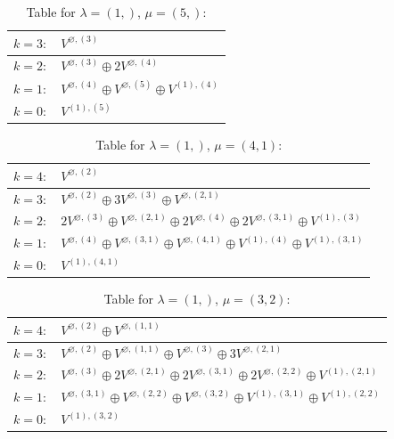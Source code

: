 \documentclass[a4paper,12pt]{article}
\begin{document}
\renewcommand{\arraystretch}{1.6} 
\begin{table}[H]
\centering
\caption{Table for $\lambda = (1,)$, $\mu = (5,)$:}
\begin{tabular}{|>{\centering\arraybackslash}p{15cm}|}
\hline
 $k = 3: \quad V^{\varnothing, (3)} $ \\ \hline
 $k = 2: \quad V^{\varnothing, (3)} \oplus 2 V^{\varnothing, (4)} $ \\ \hline
 $k = 1: \quad V^{\varnothing, (4)} \oplus V^{\varnothing, (5)} \oplus V^{(1), (4)} $ \\ \hline
 $k = 0: \quad V^{(1), (5)} $ \\ \hline
\end{tabular}
\end{table}

\renewcommand{\arraystretch}{1.6} 
\begin{table}[H]
\centering
\caption{Table for $\lambda = (1,)$, $\mu = (4, 1)$:}
\begin{tabular}{|>{\centering\arraybackslash}p{15cm}|}
\hline
 $k = 4: \quad V^{\varnothing, (2)} $ \\ \hline
 $k = 3: \quad V^{\varnothing, (2)} \oplus 3 V^{\varnothing, (3)} \oplus V^{\varnothing, (2, 1)} $ \\ \hline
 $k = 2: \quad 2 V^{\varnothing, (3)} \oplus V^{\varnothing, (2, 1)} \oplus 2 V^{\varnothing, (4)} \oplus 2 V^{\varnothing, (3, 1)} \oplus V^{(1), (3)} $ \\ \hline
 $k = 1: \quad V^{\varnothing, (4)} \oplus V^{\varnothing, (3, 1)} \oplus V^{\varnothing, (4, 1)} \oplus V^{(1), (4)} \oplus V^{(1), (3, 1)} $ \\ \hline
 $k = 0: \quad V^{(1), (4, 1)} $ \\ \hline
\end{tabular}
\end{table}

\renewcommand{\arraystretch}{1.6} 
\begin{table}[H]
\centering
\caption{Table for $\lambda = (1,)$, $\mu = (3, 2)$:}
\begin{tabular}{|>{\centering\arraybackslash}p{15cm}|}
\hline
 $k = 4: \quad V^{\varnothing, (2)} \oplus V^{\varnothing, (1, 1)} $ \\ \hline
 $k = 3: \quad V^{\varnothing, (2)} \oplus V^{\varnothing, (1, 1)} \oplus V^{\varnothing, (3)} \oplus 3 V^{\varnothing, (2, 1)} $ \\ \hline
 $k = 2: \quad V^{\varnothing, (3)} \oplus 2 V^{\varnothing, (2, 1)} \oplus 2 V^{\varnothing, (3, 1)} \oplus 2 V^{\varnothing, (2, 2)} \oplus V^{(1), (2, 1)} $ \\ \hline
 $k = 1: \quad V^{\varnothing, (3, 1)} \oplus V^{\varnothing, (2, 2)} \oplus V^{\varnothing, (3, 2)} \oplus V^{(1), (3, 1)} \oplus V^{(1), (2, 2)} $ \\ \hline
 $k = 0: \quad V^{(1), (3, 2)} $ \\ \hline
\end{tabular}
\end{table}
\end{document}
